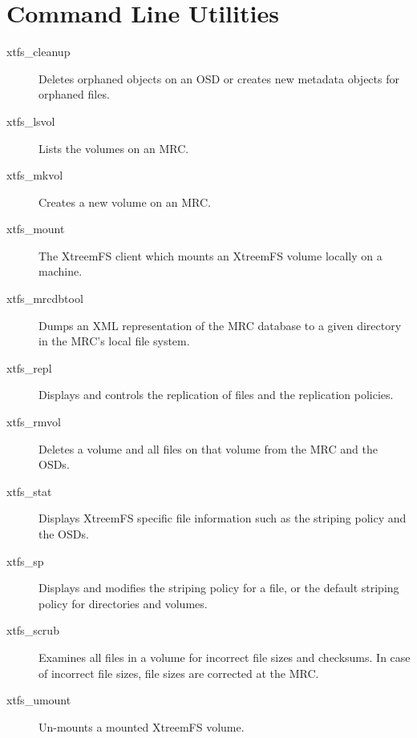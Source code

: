 \documentclass[a4paper,10pt]{book}
\begin{document}
\chapter{Command Line Utilities}

\begin{description}
 \item[xtfs\_cleanup] Deletes orphaned objects on an OSD or creates new metadata objects for orphaned files.
 \item[xtfs\_lsvol] Lists the volumes on an MRC.
 \item[xtfs\_mkvol] Creates a new volume on an MRC.
 \item[xtfs\_mount] The XtreemFS client which mounts an XtreemFS volume locally on a machine.
 \item[xtfs\_mrcdbtool] Dumps an XML representation of the MRC database to a given directory in the MRC's local file system.
 \item[xtfs\_repl] Displays and controls the replication of files and the replication policies.
 \item[xtfs\_rmvol] Deletes a volume and all files on that volume from the MRC and the OSDs.
 \item[xtfs\_stat] Displays XtreemFS specific file information such as the striping policy and the OSDs.
 \item[xtfs\_sp] Displays and modifies the striping policy for a file, or the default striping policy for directories and volumes.
 \item[xtfs\_scrub] Examines all files in a volume for incorrect file sizes and checksums. In case of incorrect file sizes, file sizes are corrected at the MRC.
 \item[xtfs\_umount] Un-mounts a mounted XtreemFS volume.
 \end{description}

\printindex
\end{document}
